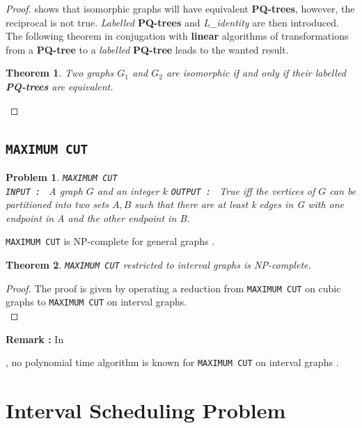 \documentclass{article}
\newtheorem{theorem}{Theorem}[section]
\newtheorem{problem}{Problem}[section]
\begin{document}
\begin{proof}
    \cite{isomorphism} shows that isomorphic graphs will have
    equivalent \textbf{PQ-trees}, however, the reciprocal is not true.
    \emph{Labelled} \textbf{PQ-trees} and \emph{L\_identity} are then introduced.\\

    The following theorem in conjugation with \textbf{linear} algorithms
    of transformations from a \textbf{PQ-tree} to a \emph{labelled} \textbf{PQ-tree}
    leads to the wanted result.\\

    \begin{theorem}
        Two graphs $G_1$ and $G_2$ are isomorphic
        if and only if their labelled \textbf{PQ-trees} are equivalent.
    \end{theorem}
\end{proof}

\subsection{\texttt{MAXIMUM CUT}}

\begin{problem}
    \texttt{MAXIMUM CUT}\\
    \texttt{INPUT : } A graph $G$ and an integer $k$
    \texttt{OUTPUT : }  True iff the vertices of $G$ can be 
                        partitioned into two sets $A,B$ such that 
                        there are at least k edges in G with 
                        one endpoint in A and the other endpoint 
                        in B. 
\end{problem}

\texttt{MAXIMUM CUT} is NP-complete for general graphs \cite{karp}.

\begin{theorem}
    \texttt{MAXIMUM CUT} restricted to interval graphs is NP-complete.
\end{theorem}

\begin{proof}
    The proof is given by \cite{adhikary} operating a reduction from \texttt{MAXIMUM CUT} on cubic graphs to \texttt{MAXIMUM CUT} on interval graphs.\\
\end{proof}

\textbf{Remark : } In \date{2024}, no polynomial time algorithm is known for \texttt{MAXIMUM CUT} on interval graphs \cite{graphclasses}.

\section{Interval Scheduling Problem}
\end{document}
